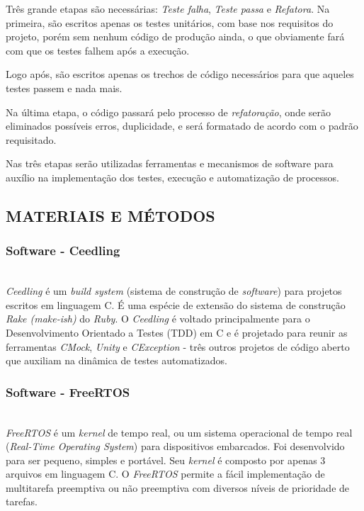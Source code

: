 \documentclass[times, twoside, watermark]{artigo}
\begin{document}
Três grande etapas são necessárias: \textit{Teste falha}, \textit{Teste passa}
e \textit{Refatora}. Na primeira, são escritos apenas os testes unitários, com base 
nos requisitos do projeto, porém sem nenhum código de produção ainda, o que 
obviamente fará com que os testes falhem após a execução.

Logo após, são escritos apenas os trechos de código necessários para que aqueles 
testes passem e nada mais.

Na última etapa, o código passará pelo processo de \textit{refatoração}, onde serão 
eliminados possíveis erros, duplicidade, e será formatado de acordo com o padrão 
requisitado.

Nas três etapas serão utilizadas ferramentas e mecanismos de software para auxílio
na implementação dos testes, execução e automatização de processos.

\subsection{MATERIAIS E MÉTODOS}

\subsubsection{Software - Ceedling}\hfill\\

\textit{Ceedling} é um \textit{build system} (sistema de construção de 
\textit{software}) para projetos escritos em linguagem C.
É uma espécie de extensão do sistema de construção \textit{Rake (make-ish)} do \textit{Ruby}.
O \textit{Ceedling} é voltado principalmente para o 
Desenvolvimento Orientado a Testes (TDD) em C e é projetado para reunir as ferramentas \textit{CMock},
\textit{Unity} e \textit{CException} - três outros projetos de código aberto 
que auxiliam na dinâmica de testes automatizados\cite{gomes2016uttos}.


\subsubsection{Software - FreeRTOS}\hfill\\

\textit{FreeRTOS} é um \textit{kernel} de tempo real, 
ou um sistema operacional de tempo real (\textit{Real-Time Operating System}) 
para dispositivos embarcados. Foi desenvolvido para ser pequeno, simples e portável. 
Seu \textit{kernel} é composto por apenas 3 arquivos em linguagem C. 
O \textit{FreeRTOS} permite a fácil implementação de multitarefa preemptiva 
ou não preemptiva com diversos níveis de prioridade de tarefas\cite{zhu2016understanding}.
\end{document}
